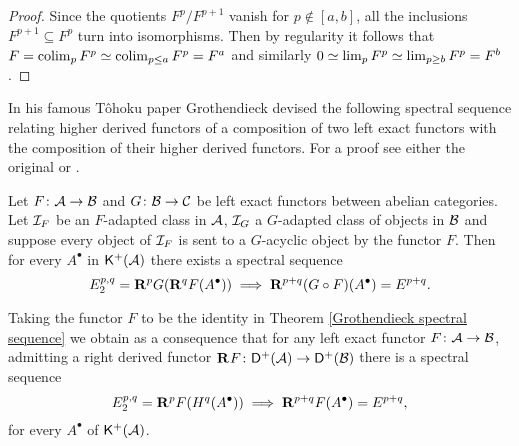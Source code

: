 \begin{proof}
    Since the quotients $F^p/F^{p+1}$ vanish for $p \notin [a,b]$, all the inclusions $F^{p+1} \subseteq F^p$ turn into isomorphisms. Then by regularity it follows that $F = \operatorname{colim}_p F^p \simeq \operatorname{colim}_{p \leq a} F^p = F^{a}$ and similarly $0 \simeq \lim_p F^p \simeq \lim_{p \geq b} F^p =  F^b$.
\end{proof}


In his famous Tôhoku paper \cite{grothendieck57} Grothendieck devised the following spectral sequence relating higher derived functors of a composition of two left exact functors with the composition of their higher derived functors. For a proof see either the original \cite[\S 2.4]{grothendieck57} or \cite[\S III.7, Theorem 7]{gelfand2002methods}.

\begin{theorem}
    \label{Grothendieck spectral sequence}
    \emph{\cite{grothendieck57}}
    Let $F\colon \mathcal A \to \mathcal B$ and $G\colon \mathcal B \to \mathcal C$ be left exact functors between abelian categories. Let $\mathcal I_F$ be an $F$-adapted class in $\mathcal A$, $\mathcal I_G$ a $G$-adapted class of objects in $\mathcal B$ and suppose every object of $\mathcal I_F$ is sent to a $G$-acyclic object by the functor $F$. Then for every $A^\bullet$ in $\mathsf{K}^+(\mathcal A)$ there exists a spectral sequence
    \begin{equation}
        \label{eq: Grothendieck spectral sequence}
        E^{p,q}_2 = \mathbf{R}^{p}G(\mathbf{R}^{q}F(A^\bullet)) \implies \mathbf{R}^{p+q}(G \circ F)(A^\bullet) = E^{p+q}.
    \end{equation} 
\end{theorem}

\begin{remark}
    Taking the functor $F$ to be the identity in Theorem \ref{Grothendieck spectral sequence} we obtain as a consequence that for any left exact functor $F \colon \mathcal A \to \mathcal B$, admitting a right derived functor $\mathbf{R}^{}F\colon \mathsf{D}^+(\mathcal A) \to \mathsf{D}^+(\mathcal B)$ there is a spectral sequence 
    \begin{equation}
        \label{eq: special case of Grothendieck spectral sequence}
        E^{p,q}_2 = \mathbf{R}^{p}F(H^q(A^\bullet)) \implies \mathbf{R}^{p+q}F(A^\bullet) = E^{p+q},
    \end{equation}
    for every $A^\bullet$ of $\mathsf{K}^+(\mathcal A)$.
\end{remark}

